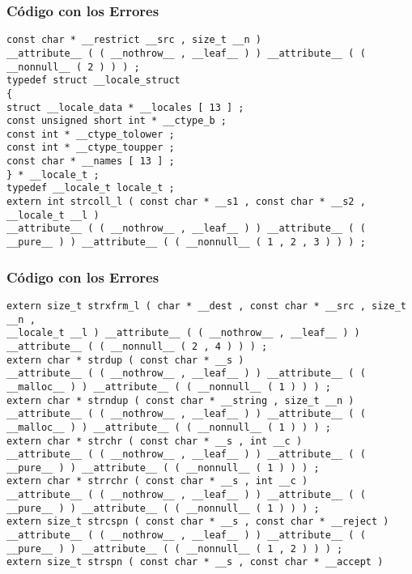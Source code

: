 \documentclass{beamer}
\begin{document}
\begin{frame}[fragile]
\frametitle{C\'odigo con los Errores}
\begin{lstlisting}[style=CStyle]
const char * __restrict __src , size_t __n ) 
__attribute__ ( ( __nothrow__ , __leaf__ ) ) __attribute__ ( ( __nonnull__ ( 2 ) ) ) ; 
typedef struct __locale_struct 
{ 
struct __locale_data * __locales [ 13 ] ; 
const unsigned short int * __ctype_b ; 
const int * __ctype_tolower ; 
const int * __ctype_toupper ; 
const char * __names [ 13 ] ; 
} * __locale_t ; 
typedef __locale_t locale_t ; 
extern int strcoll_l ( const char * __s1 , const char * __s2 , __locale_t __l ) 
__attribute__ ( ( __nothrow__ , __leaf__ ) ) __attribute__ ( ( __pure__ ) ) __attribute__ ( ( __nonnull__ ( 1 , 2 , 3 ) ) ) ; 
\end{lstlisting}
\end{frame}
\begin{frame}[fragile]
\frametitle{C\'odigo con los Errores}
\begin{lstlisting}[style=CStyle]
extern size_t strxfrm_l ( char * __dest , const char * __src , size_t __n , 
__locale_t __l ) __attribute__ ( ( __nothrow__ , __leaf__ ) ) __attribute__ ( ( __nonnull__ ( 2 , 4 ) ) ) ; 
extern char * strdup ( const char * __s ) 
__attribute__ ( ( __nothrow__ , __leaf__ ) ) __attribute__ ( ( __malloc__ ) ) __attribute__ ( ( __nonnull__ ( 1 ) ) ) ; 
extern char * strndup ( const char * __string , size_t __n ) 
__attribute__ ( ( __nothrow__ , __leaf__ ) ) __attribute__ ( ( __malloc__ ) ) __attribute__ ( ( __nonnull__ ( 1 ) ) ) ; 
extern char * strchr ( const char * __s , int __c ) 
__attribute__ ( ( __nothrow__ , __leaf__ ) ) __attribute__ ( ( __pure__ ) ) __attribute__ ( ( __nonnull__ ( 1 ) ) ) ; 
extern char * strrchr ( const char * __s , int __c ) 
__attribute__ ( ( __nothrow__ , __leaf__ ) ) __attribute__ ( ( __pure__ ) ) __attribute__ ( ( __nonnull__ ( 1 ) ) ) ; 
extern size_t strcspn ( const char * __s , const char * __reject ) 
__attribute__ ( ( __nothrow__ , __leaf__ ) ) __attribute__ ( ( __pure__ ) ) __attribute__ ( ( __nonnull__ ( 1 , 2 ) ) ) ; 
extern size_t strspn ( const char * __s , const char * __accept ) 
\end{lstlisting}
\end{frame}
\end{document}
